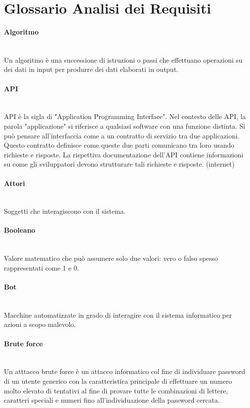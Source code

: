 \section{Glossario Analisi dei Requisiti}

\paragraph{Algoritmo}~\smallskip \\
Un algoritmo è una successione di istruzioni o passi che effettuano operazioni su dei dati in input per produrre dei dati elaborati in output.

\paragraph{API}~\smallskip \\
API è la sigla di "Application Programming Interface". Nel contesto delle API, la parola "applicazione" si riferisce a qualsiasi software con una funzione distinta. Si può pensare all'interfaccia come a un contratto di servizio tra due applicazioni. Questo contratto definisce come queste due parti comunicano tra loro usando richieste e risposte. La rispettiva documentazione dell'API contiene informazioni su come gli sviluppatori devono strutturare tali richieste e risposte. (internet)

\paragraph{Attori}~\smallskip \\
Soggetti che interagiscono con il sistema.

\paragraph{Booleano}~\smallskip \\
Valore matematico che può assumere solo due valori: vero o falso spesso rappresentati come 1 e 0.

\paragraph{Bot}~\smallskip \\
Macchine automatizzate in grado di interagire con il sistema informatico per azioni a scopo malevolo.

\paragraph{Brute force}~\smallskip \\
Un atttacco brute force è un attacco informatico col fine di individuare password di un utente generico con la caratteristica principale di effettuare un numero molto elevato di tentativi al fine di provare tutte le combinazioni di lettere, caratteri speciali e numeri fino all'individuazione della password cercata.

